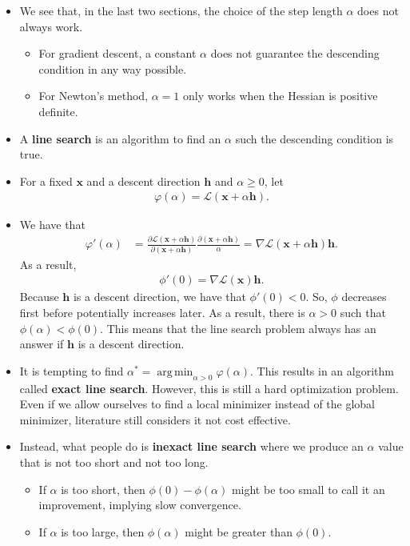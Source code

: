 \documentclass[10pt]{article}
\newcommand{\ve}[1]{\mathbf{#1}}
\newcommand{\mcal}[1]{\mathcal{#1}}
\DeclareMathOperator*{\argmin}{arg\,min}
\begin{document}
\begin{itemize}
    \item We see that, in the last two sections, the choice of the step length $\alpha$ does not always work.
    \begin{itemize}
        \item For gradient descent, a constant $\alpha$ does not guarantee the descending condition in any way possible.
        \item For Newton's method, $\alpha = 1$ only works when the Hessian is positive definite.
    \end{itemize}

    \item A {\bf line search} is an algorithm to find an $\alpha$ such the descending condition is true.
    
    \item For a fixed $\ve{x}$ and a descent direction $\ve{h}$ and $\alpha \geq 0$, let
    \begin{align*}
        \varphi(\alpha) = \mcal{L}(\ve{x} + \alpha \ve{h}).
    \end{align*}
    
    \item We have that
    \begin{align*}
        \varphi'(\alpha) 
        &= \frac{\partial \mcal{L}(\ve{x} + \alpha \ve{h})}{\partial (\ve{x} + \alpha \ve{h})} \frac{\partial(\ve{x} + \alpha \ve{h})}{\alpha}
        = \nabla \mcal{L}(\ve{x} + \alpha \ve{h}) \ve{h}.
    \end{align*}
    As a result,
    \begin{align*}
        \phi'(0) = \nabla \mcal{L}(\ve{x}) \ve{h}.
    \end{align*}
    Because $\ve{h}$ is a descent direction, we have that $\phi'(0) < 0$. So, $\phi$ decreases first before potentially increases later. As a result, there is $\alpha > 0$ such that $\phi(\alpha) < \phi(0)$. This means that the line search problem always has an answer if $\ve{h}$ is a descent direction.

    \item It is tempting to find $\alpha^* = \argmin_{\alpha > 0} \varphi(\alpha)$. This results in an algorithm called {\bf exact line search}. However, this is still a hard optimization problem. Even if we allow ourselves to find a local minimizer instead of the global minimizer, literature still considers it not cost effective.
    
    \item Instead, what people do is {\bf inexact line search} where we produce an $\alpha$ value that is not too short and not too long.
    \begin{itemize}
        \item If $\alpha$ is too short, then $\phi(0) - \phi(\alpha)$ might be too small to call it an improvement, implying slow convergence.
        \item If $\alpha$ is too large, then $\phi(\alpha)$ might be greater than $\phi(0)$.
    \end{itemize}    
\end{itemize}
\end{document}
